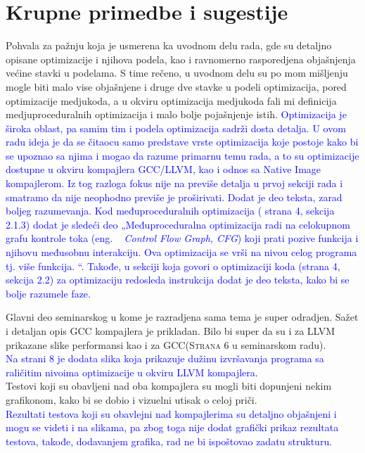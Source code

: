 \documentclass[a4paper]{report}
\newcommand{\odgovor}[1]{\textcolor{blue}{#1}}
\begin{document}
\section{Krupne primedbe i sugestije}

Pohvala za pažnju koja je usmerena ka uvodnom delu rada, gde su detaljno opisane optimizacije i njihova podela, kao i ravnomerno rasporedjena objašnjenja većine stavki u podelama. S time rečeno, u uvodnom delu su po mom mišljenju mogle biti malo vise objašnjene i druge dve stavke u podeli optimizacija, pored optimizacije medjukoda, a u okviru optimizacija medjukoda fali mi definicija medjuproceduralnih optimizacija i malo bolje pojašnjenje istih. 
\odgovor{ Optimizacija je široka oblast, pa samim tim i podela optimizacija sadrži dosta detalja. U ovom radu ideja je da se čitaocu samo predstave vrste optimizacija koje postoje kako bi se 
          upoznao sa njima i mogao da razume primarnu temu rada, a to su optimizacije dostupne u okviru kompajlera GCC/LLVM, kao i odnos sa Native Image kompajlerom.
          Iz tog razloga fokus nije na previše detalja u prvoj sekciji rada i smatramo da nije neophodno previše je proširivati. Dodat je deo teksta, zarad boljeg razumevanja.
          Kod međuproceduralnih optimizacija ( strana 4, sekcija 2.1.3) dodat je sledeći deo 
          „Međuproceduralna optimizacija radi na celokupnom grafu kontrole toka (eng. ~ {\em Control Flow Graph, CFG}) koji prati pozive funkcija i njihovu međusobnu interakciju. 
          Ova optimizacija se vrši na nivou celog programa tj. više funkcija. “.
          Takođe, u sekciji koja govori o optimizaciji koda (strana 4, sekcija 2.2) za optimizaciju redosleda instrukcija dodat je deo teksta, kako bi se bolje razumele faze. 
}

Glavni deo seminarskog u kome je razradjena sama tema je super odradjen. Sažet i detaljan opis GCC kompajlera je prikladan. Bilo bi super da su i za LLVM prikazane slike performansi kao i za GCC(\textsc{Strana 6} u seminarskom radu). \\
\odgovor{Na strani 8 je dodata slika koja prikazuje dužinu izvršavanja programa sa raličitim nivoima optimizacije u okviru LLVM kompajlera.} \\ Testovi koji su obavljeni nad oba kompajlera su mogli biti dopunjeni nekim grafikonom, kako bi se dobio i vizuelni utisak o celoj priči. \\ \odgovor{Rezultati testova koji su obavlejni nad kompajlerima su detaljno objašnjeni i mogu se videti i na slikama, pa zbog toga nije dodat grafički prikaz rezultata testova, takođe, dodavanjem grafika, rad ne bi ispoštovao zadatu strukturu.}
\end{document}
